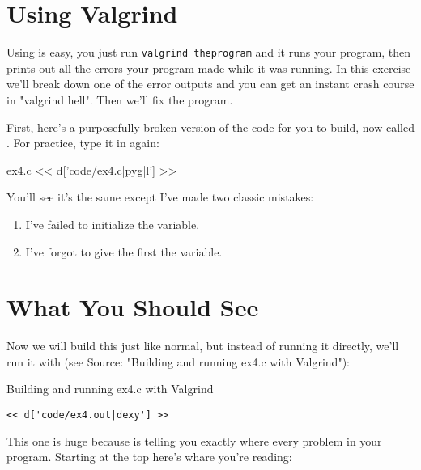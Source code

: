 \section{Using Valgrind}

Using  is easy, you just run \verb|valgrind theprogram| and it
runs your program, then prints out all the errors your program made while it
was running.  In this exercise we'll break down one of the error outputs
and you can get an instant crash course in "valgrind hell".  Then we'll
fix the program.

First, here's a purposefully broken version of the  code
for you to build, now called .  For practice, type it
in again:

\begin{code}{ex4.c}
<< d['code/ex4.c|pyg|l'] >>
\end{code}

You'll see it's the same except I've made two classic mistakes:

\begin{enumerate}
\item I've failed to initialize the  variable.
\item I've forgot to give the first  the  variable.
\end{enumerate}

\section{What You Should See}

Now we will build this just like normal, but instead of running it
directly, we'll run it with  (see Source: "Building and running ex4.c with Valgrind"):

\begin{Terminal}{Building and running ex4.c with Valgrind}
\begin{lstlisting}
<< d['code/ex4.out|dexy'] >>
\end{lstlisting}
\end{Terminal}

This one is huge because  is telling you exactly where
every problem in your program.  Starting at the top here's whare you're
reading:

